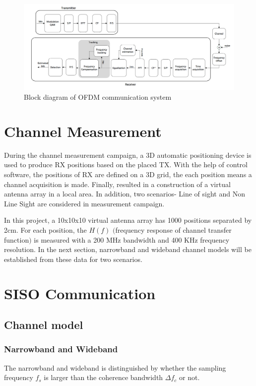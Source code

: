\documentclass[a4paper]{article}
\begin{document}
	\begin{figure}[ht]  
		\centering
		\includegraphics[width=0.9\linewidth]{figures/OFDM_general.png}
		\caption{Block diagram of OFDM communication system}
		\label{fig:ofdm_general}
	\end{figure}
	
	\section{Channel Measurement}
	
	During the channel measurement campaign, a 3D automatic positioning device is used to produce RX positions based on the placed TX. With the help of control software, the positions of RX are defined on a 3D grid, the each position means a channel acquisition is made. Finally, resulted in a construction of a virtual antenna array in a local area. In addition, two scenarios- Line of sight and Non Line Sight are considered in measurement campaign.
	
	In this project, a 10x10x10 virtual antenna array has 1000 positions separated by 2cm. For each position, the $H(f)$ $( $frequency response of channel transfer function$)$ is measured with a 200 MHz bandwidth and 400 KHz frequency resolution. In the next section, narrowband and wideband channel models will be established from these data for two scenarios.
	
	\section{SISO Communication}
	\subsection{Channel model}
	\subsubsection{Narrowband and Wideband}
	
	The narrowband and wideband is distinguished by whether the sampling frequency $f_s$ is larger than the coherence bandwidth $\Delta f_c$ or not. 
	
\end{document}
